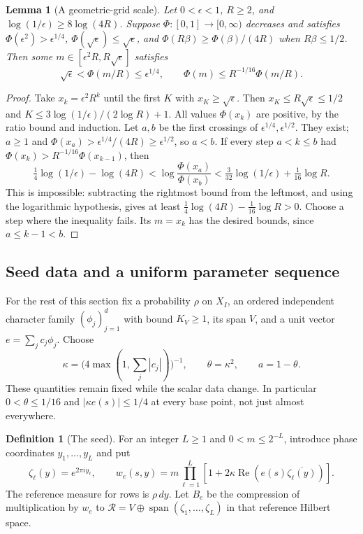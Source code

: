 \documentclass[reqno,a4paper,12pt]{amsart}
\newtheorem{lemma}[theorem]{Lemma}
\theoremstyle{definition}
\newtheorem{definition}[theorem]{Definition}
\newcommand{\spn}{\operatorname{span}}
\begin{document}
\begin{lemma}[A geometric-grid scale]\label{lem:scale}
Let $0<\epsilon<1$, $R\ge2$, and
$\log(1/\epsilon)\ge8\log(4R)$.
Suppose $\Phi:[0,1]\to[0,\infty)$ decreases and satisfies
$\Phi(\epsilon^2)>\epsilon^{1/4}$,
$\Phi(\sqrt\epsilon)\le\sqrt\epsilon$, and
$\Phi(R\beta)\ge\Phi(\beta)/(4R)$ when $R\beta\le1/2$.
Then some $m\in[\epsilon^2R,R\sqrt\epsilon]$ satisfies
\[
 \sqrt\epsilon<\Phi(m/R)\le\epsilon^{1/4},\qquad
 \Phi(m)\le R^{-1/16}\Phi(m/R).
\]
\end{lemma}
\begin{proof}
Take $x_k=\epsilon^2R^k$ until the first $K$ with
$x_K\ge\sqrt\epsilon$. Then
$x_K\le R\sqrt\epsilon\le1/2$ and
$K\le3\log(1/\epsilon)/(2\log R)+1$.
All values $\Phi(x_k)$ are positive, by the ratio bound and induction.
Let $a,b$ be the first crossings of $\epsilon^{1/4},\epsilon^{1/2}$.
They exist; $a\ge1$ and
$\Phi(x_a)>\epsilon^{1/4}/(4R)\ge\epsilon^{1/2}$, so $a<b$.
If every step $a<k\le b$ had
$\Phi(x_k)>R^{-1/16}\Phi(x_{k-1})$, then
\[
 \tfrac14\log(1/\epsilon)-\log(4R)
 <\log\frac{\Phi(x_a)}{\Phi(x_b)}
 <\tfrac3{32}\log(1/\epsilon)+\tfrac1{16}\log R.
\]
This is impossible: subtracting the rightmost bound from the leftmost,
and using the logarithmic hypothesis, gives at least
$\frac14\log(4R)-\frac1{16}\log R>0$.
Choose a step where the inequality fails. Its $m=x_k$ has the desired
bounds, since $a\le k-1<b$.
\end{proof}

\subsection{Seed data and a uniform parameter sequence}
For the rest of this section fix a probability $\rho$ on $X_I$, an
ordered independent character family $(\phi_j)_{j=1}^d$ with bound
$K_V\ge1$, its span $V$, and a unit vector $e=\sum_jc_j\phi_j$.
Choose
\[
 \kappa=\bigl(4\max(1,\sum_j|c_j|)\bigr)^{-1},\qquad
 \theta=\kappa^2,\qquad a=1-\theta.
\]
These quantities remain fixed while the scalar data change.
In particular $0<\theta\le1/16$ and $|\kappa e(s)|\le1/4$ at every
base point, not just almost everywhere.

\begin{definition}[The seed]\label{def:seed}
For an integer $L\ge1$ and $0<m\le2^{-L}$, introduce phase coordinates
$y_1,\ldots,y_L$ and put
\[
 \zeta_\ell(y)=e^{2\pi iy_\ell},\qquad
 w_e(s,y)=m\prod_{\ell=1}^L
 [1+2\kappa\operatorname{Re}(e(s)\overline{\zeta_\ell(y)})].
\]
The reference measure for rows is $\rho\,dy$.
Let $B_e$ be the compression of multiplication by $w_e$ to
$\mathcal R=V\oplus\spn(\zeta_1,\ldots,\zeta_L)$ in that reference
Hilbert space.
\end{definition}
\end{document}
